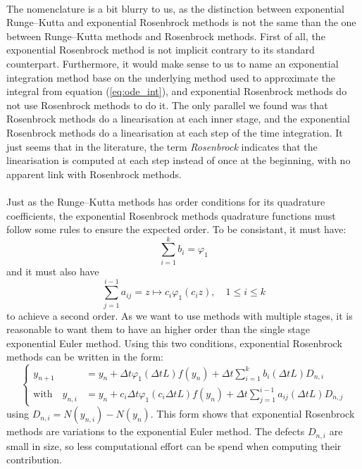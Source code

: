    \paragraph{}
    The nomenclature is a bit blurry to us, as the distinction between exponential Runge--Kutta and exponential Rosenbrock methods is not the same than the one between Runge--Kutta methods and Rosenbrock methods.
    First of all, the exponential Rosenbrock method is not implicit contrary to its standard counterpart.
    Furthermore, it would make sense to us to name an exponential integration method base on the underlying method used to approximate the integral from equation (\ref{eq:ode_int}), and exponential Rosenbrock methods do not use Rosenbrock methods to do it.
    The only parallel we found was that Rosenbrock methods do a linearisation at each inner stage, and the exponential Rosenbrock methods do a linearisation at each step of the time integration.
    It just seems that in the literature, the term \emph{Rosenbrock} indicates that the linearisation is computed at each step instead of once at the beginning, with no apparent link with Rosenbrock methods.

    \paragraph{}
    Just as the Runge--Kutta methods has order conditions for its quadrature coefficients, the exponential Rosenbrock methods quadrature functions must follow some rules to ensure the expected order.
    To be consistant, it must have:
    \begin{equation}
      \sum_{i = 1}^k b_i = \varphi_1
    \end{equation}
    and it must also have
    \begin{equation}
       \sum_{j = 1}^{i-1} a_{ij} = z \mapsto c_i \varphi_1\left(c_i z\right), \quad 1 \leq i \leq k
    \end{equation}
    to achieve a second order.
    As we want to use methods with multiple stages, it is reasonable to want them to have an higher order than the single stage exponential Euler method.
    Using this two conditions, exponential Rosenbrock methods can be written in the form:
    \begin{equation}
      \left\{\begin{aligned}
        y_{n+1} &= y_n  + \Delta t \varphi_1\left(\Delta t L\right) f\left(y_n\right) + \Delta t \sum_{i = 1}^k b_i\left(\Delta t L\right) D_{n,i} \\
        \textrm{with}\quad y_{n,i} &= y_n  + c_i \Delta t \varphi_1\left(c_i \Delta t L\right) f\left(y_n\right) + \Delta t \sum_{j = 1}^{i-1} a_{ij}\left(\Delta t L\right) D_{n,j}
      \end{aligned}\right.
    \end{equation}
    using $D_{n,i} = N\left(y_{n,i}\right) - N\left(y_n\right)$.
    This form shows that exponential Rosenbrock methods are variations to the exponential Euler method.
    The defects $D_{n,i}$ are small in size, so less computational effort can be spend when computing their contribution.

